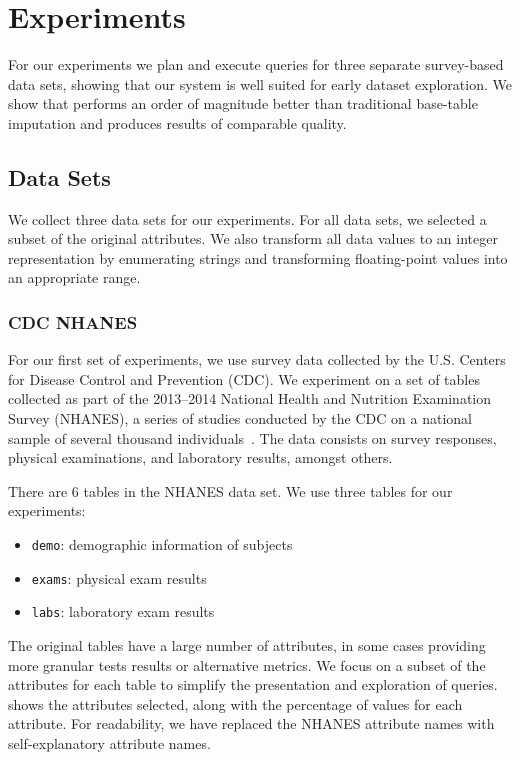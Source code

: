 \section{Experiments}\label{sec:experiments}
For our experiments we plan and execute queries for three separate survey-based data sets, showing that our system is well suited for early dataset exploration.
We show that \ProjectName{} performs an order of magnitude better than traditional
base-table imputation and produces results of comparable quality.

\subsection{Data Sets}\label{subsec:datasets}
We collect three data sets for our experiments.
For all data sets, we selected a subset of the original attributes.
We also transform all data values to an integer representation by enumerating strings and transforming floating-point values into an appropriate range.

\subsubsection{CDC NHANES}
For our first set of experiments, we use survey data collected by the 
U.S. Centers for Disease Control and Prevention (CDC). We
experiment on a set of tables collected as part of the 2013--2014 National
Health and Nutrition Examination Survey (NHANES), a series of studies
conducted by the CDC on a national sample of several thousand individuals~\cite{cdc-data}.
The data consists on survey responses, physical examinations, and laboratory
results, amongst others.

There are 6 tables in the NHANES data set. We use three tables for our experiments:

\begin{itemize}
	\item \texttt{demo}: demographic information of subjects
	\item \texttt{exams}: physical exam results
	\item \texttt{labs}: laboratory exam results
\end{itemize}

The original tables have a large number of attributes, in some cases providing more granular tests results or alternative metrics.
We focus on a subset of the attributes for each table to simplify the presentation and exploration of queries.
 shows the attributes selected, along with the percentage of \nullv{} values for each attribute.
For readability, we have replaced the NHANES attribute names with self-explanatory attribute names.

